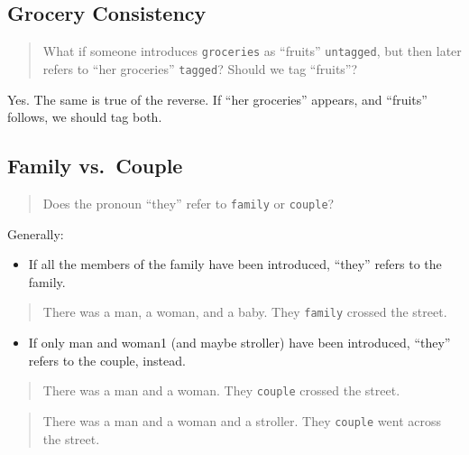 \documentclass[
]{book}
\providecommand{\tightlist}{%
  \setlength{\itemsep}{0pt}\setlength{\parskip}{0pt}}
\begin{document}
\hypertarget{grocery-consistency}{%
\subsection{Grocery Consistency}\label{grocery-consistency}}

\begin{quote}
What if someone introduces \texttt{groceries} as ``fruits'' \texttt{untagged},
but then later refers to ``her groceries'' \texttt{tagged}?
Should we tag ``fruits''?
\end{quote}

Yes. The same is true of the reverse.
If ``her groceries'' appears, and ``fruits'' follows, we should tag both.

\hypertarget{family-vs.-couple}{%
\subsection{Family vs.~Couple}\label{family-vs.-couple}}

\begin{quote}
Does the pronoun ``they'' refer to \texttt{family} or \texttt{couple}?
\end{quote}

Generally:

\begin{itemize}
\tightlist
\item
  If all the members of the family have been introduced,
  ``they'' refers to the family.
\end{itemize}

\begin{quote}
There was a man, a woman, and a baby.
They \texttt{family} crossed the street.
\end{quote}

\begin{itemize}
\tightlist
\item
  If only man and woman1 (and maybe stroller) have been introduced,
  ``they'' refers to the couple, instead.
\end{itemize}

\begin{quote}
There was a man and a woman.
They \texttt{couple} crossed the street.
\end{quote}

\begin{quote}
There was a man and a woman and a stroller.
They \texttt{couple} went across the street.
\end{quote}
\end{document}
